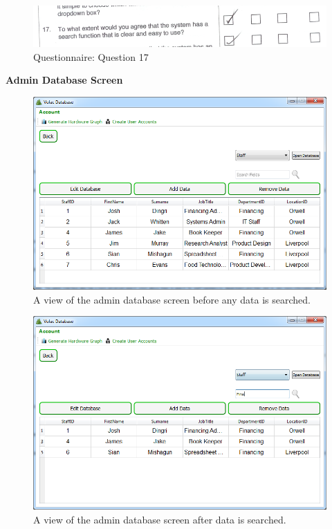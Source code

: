 \begin{figure}[H]
    \includegraphics[width=\textwidth]{./Evaluation/EvaluationQuestionnaire/17.png}
    \caption{Questionnaire: Question 17} 
\end{figure}

\textbf{Admin Database Screen}

\begin{figure}[H]
    \includegraphics[width=\textwidth]{./Evaluation/Images/beforeadminsearch.png}
    \caption{A view of the admin database screen before any data is searched.} 
\end{figure}


\begin{figure}[H]
    \includegraphics[width=\textwidth]{./Evaluation/Images/afteradminsearch.png}
    \caption{A view of the admin database screen after data is searched.} 
\end{figure}


